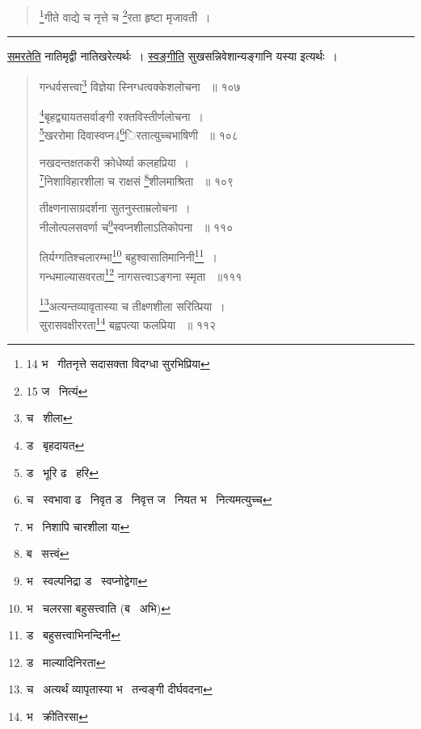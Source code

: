 \documentclass[11pt, openany]{book}
\begin{document}
{\begin{quote}
{\renewcommand{\thefootnote}{14}\footnote{14 भ \textendash\ गीतनृत्ते सदासक्ता विदग्धा सुरभिप्रिया }गीते वाद्ये च नृत्ते च \renewcommand{\thefootnote}{15}\footnote{15 ज \textendash\ नित्यं }रता हृष्टा मृजावती~। }
\end{quote}

\hrule

\vspace{2mm}

\underline{समरतेति} नातिमृद्वी नातिखरेत्यर्थः~। \underline{स्वङ्गीति} सुखसन्निवेशान्यङ्गानि यस्या इत्यर्थः~। 

\newpage

\begin{quote}
 {\na गन्धर्वसत्त्वा\renewcommand{\thefootnote}{1}\footnote{च \textendash\ शीला } विज्ञेया स्निग्धत्वक्केशलोचना ~॥ १०७ 

\renewcommand{\thefootnote}{2}\footnote{ड \textendash\ बृहदायत}बृहद्व्यायतसर्वाङ्गी रक्तविस्तीर्णलोचना~। \\
\renewcommand{\thefootnote}{3}\footnote{ड \textendash\ भूरि ढ \textendash\ हरि}खररोमा दिवास्वप्न4\renewcommand{\thefootnote}{4}\footnote{च \textendash\ स्वभावा ढ \textendash\ निवृत ड \textendash\ निवृत्त ज \textendash\ नियत भ \textendash\ नित्यमत्युच्च}िरतात्युच्चभाषिणी ~॥ १०८ 

नखदन्तक्षतकरी क्रोधेर्ष्या कलहप्रिया~।\\ 
\renewcommand{\thefootnote}{5}\footnote{भ \textendash\ निशापि चारशीला या}निशाविहारशीला च राक्षसं \renewcommand{\thefootnote}{6}\footnote{ब \textendash\ सत्त्वं}शीलमाश्रिता ~॥ १०९ 

तीक्ष्णनासाग्रदर्शना सुतनुस्ताम्रलोचना~। \\
नीलोत्पलसवर्णा च\renewcommand{\thefootnote}{7}\footnote{भ \textendash\ स्वल्पनिद्रा ड \textendash\ स्वप्नोद्वेगा }स्वप्नशीलाऽतिकोपना ~॥ ११० 

तिर्यग्गतिश्चलारम्भा\renewcommand{\thefootnote}{8}\footnote{भ \textendash\ चलरसा बहुसत्त्वाति (ब \textendash\ अभि)} बहुश्वासातिमानिनी\renewcommand{\thefootnote}{9}\footnote{ड \textendash\ बहुसत्त्वाभिनन्दिनी }~।\\ 
गन्धमाल्यासवरता\renewcommand{\thefootnote}{10}\footnote{ड \textendash\ माल्यादिनिरता } नागसत्त्वाऽङ्गना स्मृता ~॥१११ 

\renewcommand{\thefootnote}{11}\footnote{च \textendash\ अत्यर्थं व्यापृतास्या भ \textendash\ तन्वङ्गी दीर्घवदना}अत्यन्तव्यावृतास्या च तीक्ष्णशीला सरित्प्रिया~। \\
सुरासवक्षीररता\renewcommand{\thefootnote}{12}\footnote{भ \textendash\ क्रीतिरसा} बह्वपत्या फलप्रिया ~॥ ११२ 

}
\end{quote}}
\end{document}
